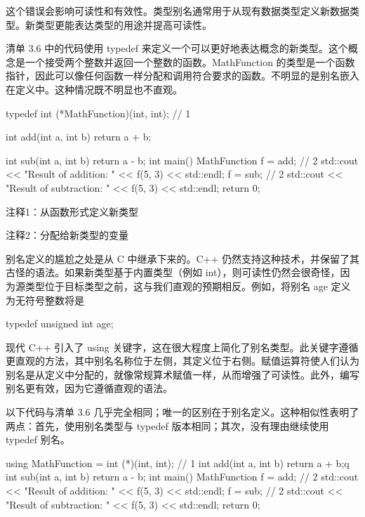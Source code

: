 
这个错误会影响可读性和有效性。类型别名通常用于从现有数据类型定义新数据类型。新类型更能表达类型的用途并提高可读性。


清单 3.6 中的代码使用 typedef 来定义一个可以更好地表达概念的新类型。这个概念是一个接受两个整数并返回一个整数的函数。MathFunction 的类型是一个函数指针，因此可以像任何函数一样分配和调用符合要求的函数。不明显的是别名嵌入在定义中。这种情况既不明显也不直观。


\begin{cpp}
typedef int (*MathFunction)(int, int); // 1

int add(int a, int b) {
  return a + b;
}

int sub(int a, int b) {
  return a - b;
}
int main() {
  MathFunction f = add; // 2
  std::cout << "Result of addition: " << f(5, 3) << std::endl;
  f = sub; // 2
  std::cout << "Result of subtraction: " << f(5, 3) << std::endl;
  return 0;
}
\end{cpp}

{\footnotesize
注释1：从函数形式定义新类型

注释2：分配给新类型的变量
}


别名定义的尴尬之处是从 C 中继承下来的。C++ 仍然支持这种技术，并保留了其古怪的语法。如果新类型基于内置类型（例如 int），则可读性仍然会很奇怪，因为源类型位于目标类型之前，这与我们直观的预期相反。例如，将别名 age 定义为无符号整数将是

\begin{cpp}
typedef unsigned int age;
\end{cpp}


现代 C++ 引入了 using 关键字，这在很大程度上简化了别名类型。此关键字遵循更直观的方法，其中别名名称位于左侧，其定义位于右侧。赋值运算符使人们认为别名是从定义中分配的，就像常规算术赋值一样，从而增强了可读性。此外，编写别名更有效，因为它遵循直观的语法。

以下代码与清单 3.6 几乎完全相同；唯一的区别在于别名定义。这种相似性表明了两点：首先，使用别名类型与 typedef 版本相同；其次，没有理由继续使用 typedef 别名。


\begin{cpp}
using MathFunction = int (*)(int, int); // 1
int add(int a, int b) {
  return a + b;q
  }
  int sub(int a, int b) {
  return a - b;
}
int main() {
  MathFunction f = add; // 2
  std::cout << "Result of addition: " << f(5, 3) << std::endl;
  f = sub; // 2
  std::cout << "Result of subtraction: " << f(5, 3) << std::endl;
  return 0;
}
\end{cpp}

